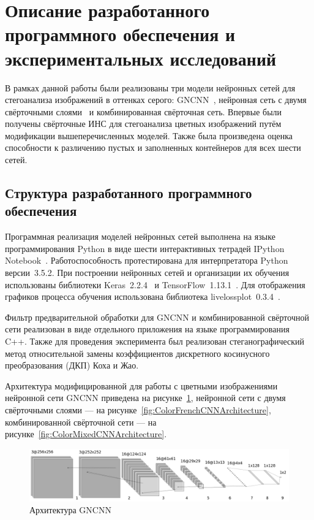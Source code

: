 
\section{Описание разработанного программного обеспечения и экспериментальных исследований}

В рамках данной работы были реализованы три модели нейронных сетей для стегоанализа изображений в оттенках серого: GNCNN~\cite{GNCNN}, нейронная сеть с двумя свёрточными слоями~\cite{FrenchCNN} и комбинированная свёрточная сеть. Впервые были получены свёрточные ИНС для стегоанализа цветных изображений путём модификации вышеперечисленных моделей. Также была произведена оценка способности к различению пустых и заполненных контейнеров для всех шести сетей.

\subsection{Структура разработанного программного обеспечения}

Программная реализация моделей нейронных сетей выполнена на языке программирования Python в виде шести интерактивных тетрадей IPython Notebook~\cite{ipynb}. Работоспособность протестирована для интерпретатора Python версии~3.5.2. При построении нейронных сетей и организации их обучения использованы библиотеки Keras~2.2.4~\cite{Keras} и TensorFlow~1.13.1~\cite{TensorFlow}. Для отображения графиков процесса обучения использована библиотека livelossplot~0.3.4~\cite{livelossplot}.

Фильтр предварительной обработки для GNCNN и комбинированной свёрточной сети реализован в виде отдельного приложения на языке программирования C++. Также для проведения эксперимента был реализован стеганографический метод относительной замены коэффициентов дискретного косинусного преобразования (ДКП) Коха и Жао.

Архитектура модифицированной для работы с цветными изображениями нейронной сети GNCNN приведена на рисунке~\ref{fig:ColorGNCNNArchitecture}, нейронной сети с двумя свёрточными слоями --- на рисунке~\ref{fig:ColorFrenchCNNArchitecture}, комбинированной свёрточной сети --- на рисунке~\ref{fig:ColorMixedCNNArchitecture}.

\begin{figure}[h]
\centering
\includegraphics[width=1\textwidth]{include/graphics/gncnn_color_architecture}
\caption{Архитектура GNCNN}
\label{fig:ColorGNCNNArchitecture}
\end{figure}

